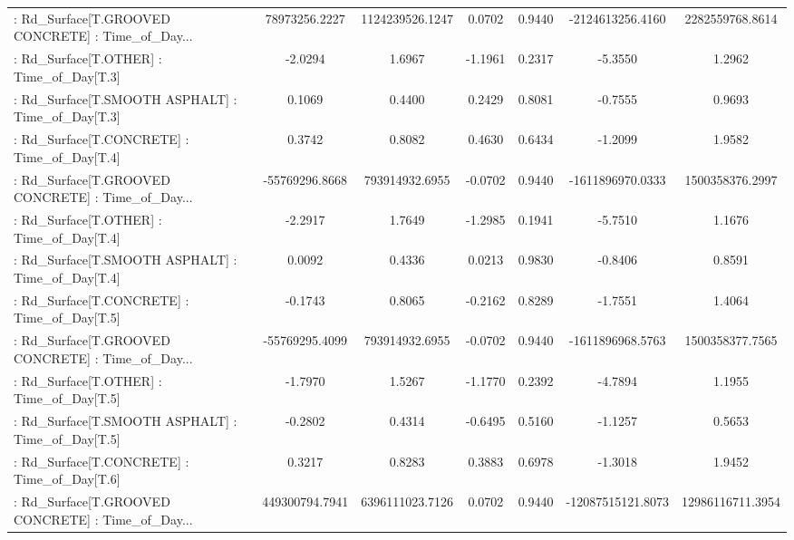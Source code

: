 \begin{longtable}{p{4cm}cccccc}
 : Rd\_Surface[T.GROOVED CONCRETE] : Time\_of\_Day... &     78973256.2227 &   1124239526.1247 &  0.0702 &       0.9440 &   -2124613256.4160 &   2282559768.8614 \\
 : Rd\_Surface[T.OTHER] : Time\_of\_Day[T.3]          &           -2.0294 &            1.6967 & -1.1961 &       0.2317 &            -5.3550 &            1.2962 \\
 : Rd\_Surface[T.SMOOTH ASPHALT] : Time\_of\_Day[T.3] &            0.1069 &            0.4400 &  0.2429 &       0.8081 &            -0.7555 &            0.9693 \\
 : Rd\_Surface[T.CONCRETE] : Time\_of\_Day[T.4]       &            0.3742 &            0.8082 &  0.4630 &       0.6434 &            -1.2099 &            1.9582 \\
 : Rd\_Surface[T.GROOVED CONCRETE] : Time\_of\_Day... &    -55769296.8668 &    793914932.6955 & -0.0702 &       0.9440 &   -1611896970.0333 &   1500358376.2997 \\
 : Rd\_Surface[T.OTHER] : Time\_of\_Day[T.4]          &           -2.2917 &            1.7649 & -1.2985 &       0.1941 &            -5.7510 &            1.1676 \\
 : Rd\_Surface[T.SMOOTH ASPHALT] : Time\_of\_Day[T.4] &            0.0092 &            0.4336 &  0.0213 &       0.9830 &            -0.8406 &            0.8591 \\
 : Rd\_Surface[T.CONCRETE] : Time\_of\_Day[T.5]       &           -0.1743 &            0.8065 & -0.2162 &       0.8289 &            -1.7551 &            1.4064 \\
 : Rd\_Surface[T.GROOVED CONCRETE] : Time\_of\_Day... &    -55769295.4099 &    793914932.6955 & -0.0702 &       0.9440 &   -1611896968.5763 &   1500358377.7565 \\
 : Rd\_Surface[T.OTHER] : Time\_of\_Day[T.5]          &           -1.7970 &            1.5267 & -1.1770 &       0.2392 &            -4.7894 &            1.1955 \\
 : Rd\_Surface[T.SMOOTH ASPHALT] : Time\_of\_Day[T.5] &           -0.2802 &            0.4314 & -0.6495 &       0.5160 &            -1.1257 &            0.5653 \\
 : Rd\_Surface[T.CONCRETE] : Time\_of\_Day[T.6]       &            0.3217 &            0.8283 &  0.3883 &       0.6978 &            -1.3018 &            1.9452 \\
 : Rd\_Surface[T.GROOVED CONCRETE] : Time\_of\_Day... &    449300794.7941 &   6396111023.7126 &  0.0702 &       0.9440 &  -12087515121.8073 &  12986116711.3954 \\

\end{longtable}
